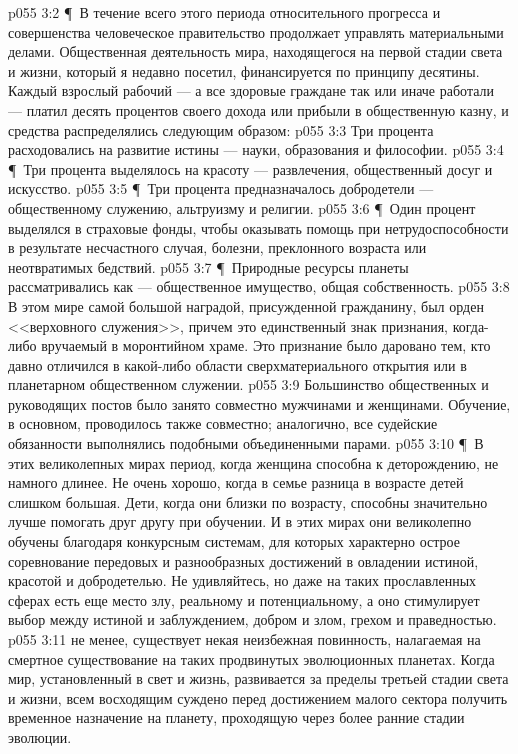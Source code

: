 \vs p055 3:2 \P\ В течение всего этого периода относительного прогресса и совершенства человеческое правительство продолжает управлять материальными делами. Общественная деятельность мира, находящегося на первой стадии света и жизни, который я недавно посетил, финансируется по принципу десятины. Каждый взрослый рабочий --- а все здоровые граждане так или иначе работали --- платил десять процентов своего дохода или прибыли в общественную казну, и средства распределялись следующим образом:
\vs p055 3:3 \bibnobreakspace Три процента расходовались на развитие истины --- науки, образования и философии.
\vs p055 3:4 \P\ \bibnobreakspace Три процента выделялось на красоту --- развлечения, общественный досуг и искусство.
\vs p055 3:5 \P\ \bibnobreakspace Три процента предназначалось добродетели --- общественному служению, альтруизму и религии.
\vs p055 3:6 \P\ \bibnobreakspace Один процент выделялся в страховые фонды, чтобы оказывать помощь при нетрудоспособности в результате несчастного случая, болезни, преклонного возраста или неотвратимых бедствий.
\vs p055 3:7 \P\ Природные ресурсы планеты рассматривались как --- общественное имущество, общая собственность.
\vs p055 3:8 В этом мире самой большой наградой, присужденной гражданину, был орден <<верховного служения>>, причем это единственный знак признания, когда\hyp{}либо вручаемый в моронтийном храме. Это признание было даровано тем, кто давно отличился в какой\hyp{}либо области сверхматериального открытия или в планетарном общественном служении.
\vs p055 3:9 Большинство общественных и руководящих постов было занято совместно мужчинами и женщинами. Обучение, в основном, проводилось также совместно; аналогично, все судейские обязанности выполнялись подобными объединенными парами.
\vs p055 3:10 \P\ В этих великолепных мирах период, когда женщина способна к деторождению, не намного длинее. Не очень хорошо, когда в семье разница в возрасте детей слишком большая. Дети, когда они близки по возрасту, способны значительно лучше помогать друг другу при обучении. И в этих мирах они великолепно обучены благодаря конкурсным системам, для которых характерно острое соревнование передовых и разнообразных достижений в овладении истиной, красотой и добродетелью. Не удивляйтесь, но даже на таких прославленных сферах есть еще место злу, реальному и потенциальному, а оно стимулирует выбор между истиной и заблуждением, добром и злом, грехом и праведностью.
\vs p055 3:11 не менее, существует некая неизбежная повинность, налагаемая на смертное существование на таких продвинутых эволюционных планетах. Когда мир, установленный в свет и жизнь, развивается за пределы третьей стадии света и жизни, всем восходящим суждено перед достижением малого сектора получить временное назначение на планету, проходящую через более ранние стадии эволюции.
